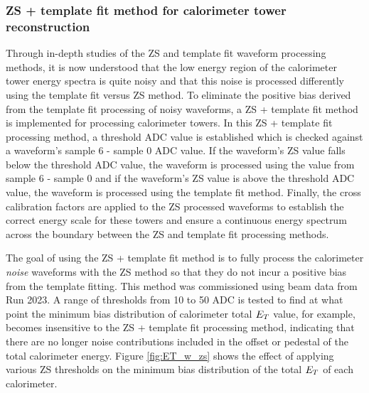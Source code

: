 \subsubsection{ZS + template fit method for calorimeter tower reconstruction}

Through in-depth studies of the ZS and template fit waveform processing methods, it is now understood that the low energy region of the calorimeter tower energy spectra is quite noisy and that this noise is processed differently using the template fit versus ZS method. 
To eliminate the positive bias derived from the template fit processing of noisy waveforms, a ZS + template fit method is implemented for processing calorimeter towers. 
In this ZS + template fit processing method, a threshold ADC value is established which is checked against a waveform's sample 6 - sample 0 ADC value. 
If the waveform's ZS value falls below the threshold ADC value, the waveform is processed using the value from sample 6 - sample 0 and if the waveform's ZS value is above the threshold ADC value, the waveform is processed using the template fit method. 
Finally, the cross calibration factors are applied to the ZS processed waveforms to establish the correct energy scale for these towers and ensure a continuous energy spectrum across the boundary between the ZS and template fit processing methods. 

The goal of using the ZS + template fit method is to fully process the calorimeter \emph{noise} waveforms with the ZS method so that they do not incur a positive bias from the template fitting. 
This method was commissioned using beam data from Run 2023.
A range of thresholds from 10 to 50 ADC is tested to find at what point the minimum bias distribution of calorimeter total $\mbox{$E_{T}$}$ value, for example, becomes insensitive to the ZS + template fit processing method, indicating that there are no longer noise contributions included in the offset or pedestal of the total calorimeter energy. 
Figure \ref{fig:ET_w_zs} shows the effect of applying various ZS thresholds on the minimum bias distribution of the total $\mbox{$E_{T}$}$ of each calorimeter. 

